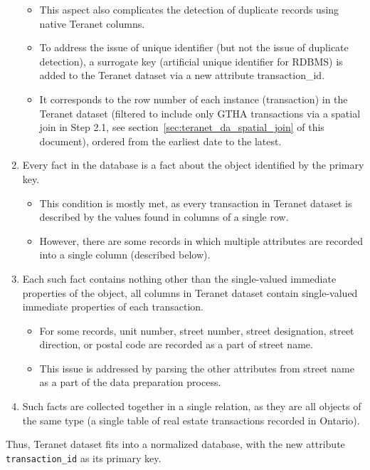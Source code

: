\begin{enumerate}
\begin{itemize}
        \item This aspect also complicates the detection of duplicate records using native Teranet columns.
        \item To address the issue of unique identifier (but not the issue of duplicate detection), a surrogate key (artificial unique identifier for RDBMS) is added to the Teranet dataset via a new attribute transaction\_id.
        \item It corresponds to the row number of each instance (transaction) in the Teranet dataset (filtered to include only GTHA transactions via a spatial join in Step 2.1, see section~\ref{sec:teranet_da_spatial_join} of this document), ordered from the earliest date to the latest.
    \end{itemize}
    \item Every fact in the database is a fact about the object identified by the primary key.
    \begin{itemize}
        \item This condition is mostly met, as every transaction in Teranet dataset is described by the values found in columns of a single row.
        \item However, there are some records in which multiple attributes are recorded into a single column (described below).
    \end{itemize}
    \item Each such fact contains nothing other than the single-valued immediate properties of the object, all columns in Teranet dataset contain single-valued immediate properties of each transaction.
    \begin{itemize}
        \item For some records, unit number, street number, street designation, street direction, or postal code are recorded as a part of street name.
        \item This issue is addressed by parsing the other attributes from street name as a part of the data preparation process.
    \end{itemize}
    \item Such facts are collected together in a single relation, as they are all objects of the same type (a single table of real estate transactions recorded in Ontario).
\end{enumerate}

Thus, Teranet dataset fits into a normalized database, with the new attribute \texttt{transaction\_id} as its primary key.

